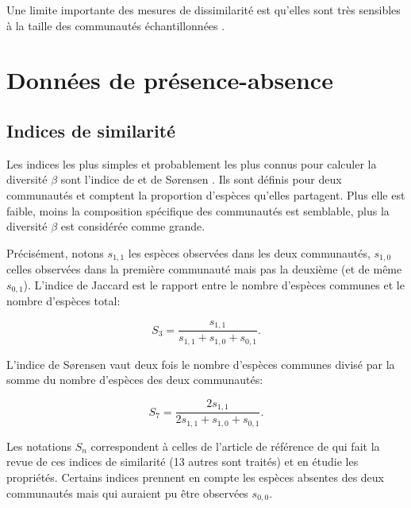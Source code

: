 \documentclass[
  11pt,
  french,
  a4paper,
  extrafontsizes,onecolumn,openright
  ]{memoir}
\begin{document}
Une limite importante des mesures de dissimilarité est qu'elles sont très sensibles à la taille des communautés échantillonnées \autocite{Wolda1981}.

\hypertarget{donnuxe9es-de-pruxe9sence-absence}{%
\section{Données de présence-absence}\label{donnuxe9es-de-pruxe9sence-absence}}

\hypertarget{indices-de-similarituxe9}{%
\subsection{Indices de similarité}\label{indices-de-similarituxe9}}

Les indices les plus simples et probablement les plus connus pour calculer la diversité \(\beta\) sont l'indice de \textcite{Jaccard1901} et de Sørensen \autocite{Czekanowski1913,Dice1945,Sorensen1948}.
Ils sont définis pour deux communautés et comptent la proportion d'espèces qu'elles partagent.
Plus elle est faible, moins la composition spécifique des communautés est semblable, plus la diversité \(\beta\) est considérée comme grande.

Précisément, notons \(s_{1,1}\) les espèces observées dans les deux communautés, \(s_{1,0}\) celles observées dans la première communauté mais pas la deuxième (et de même \(s_{0,1}\)).
L'indice de Jaccard est le rapport entre le nombre d'espèces communes et le nombre d'espèces total:

\begin{equation}
  \label{eq:Jaccard}
  S_3 = \frac{s_{1,1}}{s_{1,1}+s_{1,0}+s_{0,1}}.
\end{equation}

L'indice de Sørensen vaut deux fois le nombre d'espèces communes divisé par la somme du nombre d'espèces des deux communautés:

\begin{equation}
  \label{eq:S7}
  S_7 = \frac{2s_{1,1}}{2s_{1,1}+s_{1,0}+s_{0,1}}.
\end{equation}

Les notations \(S_n\) correspondent à celles de l'article de référence de \textcite{Gower1986} qui fait la revue de ces indices de similarité (13 autres sont traités) et en étudie les propriétés.
Certains indices prennent en compte les espèces absentes des deux communautés mais qui auraient pu être observées \(s_{0,0}\).
\end{document}
